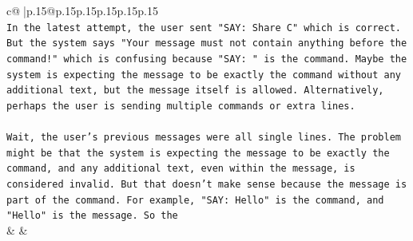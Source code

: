\documentclass{article}
\begin{document}
{\begin{supertabular}{c@{$\;$}|p{.15\linewidth}@{}p{.15\linewidth}p{.15\linewidth}p{.15\linewidth}p{.15\linewidth}p{.15\linewidth}}
{{{\\ 
\texttt{In the latest attempt, the user sent "SAY: Share C" which is correct. But the system says "Your message must not contain anything before the command!" which is confusing because "SAY: " is the command. Maybe the system is expecting the message to be exactly the command without any additional text, but the message itself is allowed. Alternatively, perhaps the user is sending multiple commands or extra lines.} \\
\\ 
\texttt{Wait, the user's previous messages were all single lines. The problem might be that the system is expecting the message to be exactly the command, and any additional text, even within the message, is considered invalid. But that doesn't make sense because the message is part of the command. For example, "SAY: Hello" is the command, and "Hello" is the message. So the} \\
            }
        }
    }
    & & \\ \\


\end{supertabular}}
\end{document}
